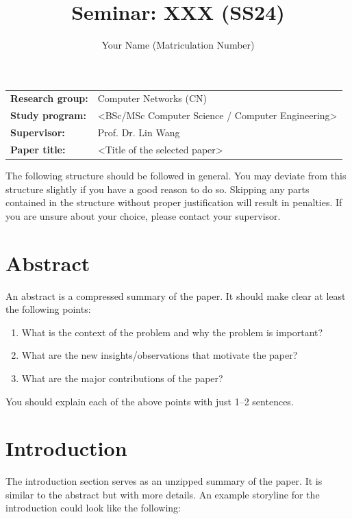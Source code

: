 \documentclass{upb-cn}
\title{Seminar: XXX (SS24)}
\author{Your Name (Matriculation Number)}
\begin{document}
\makethetitle

\begin{notebox}
    \begin{tabular}{@{}ll}
        \textbf{Research group:} & Computer Networks (CN) \\
        \textbf{Study program:} & <BSc/MSc Computer Science / Computer Engineering> \\
        \textbf{Supervisor:} & Prof. Dr. Lin Wang \\
        \textbf{Paper title:} & <Title of the selected paper>
    \end{tabular}
\end{notebox}

The following structure should be followed in general. You may deviate from this structure slightly if you have a good reason to do so. Skipping any parts contained in the structure without proper justification will result in penalties. If you are unsure about your choice, please contact your supervisor.

\section*{Abstract}

An abstract is a compressed summary of the paper. It should make clear at least the following points:
\begin{enumerate}
    \item What is the context of the problem and why the problem is important?
    \item What are the new insights/observations that motivate the paper?
    \item What are the major contributions of the paper?
\end{enumerate}

You should explain each of the above points with just 1--2 sentences.



\section{Introduction}
\label{sec:introduction}

The introduction section serves as an unzipped summary of the paper. It is similar to the abstract but with more details. An example storyline for the introduction could look like the following:
\end{document}
